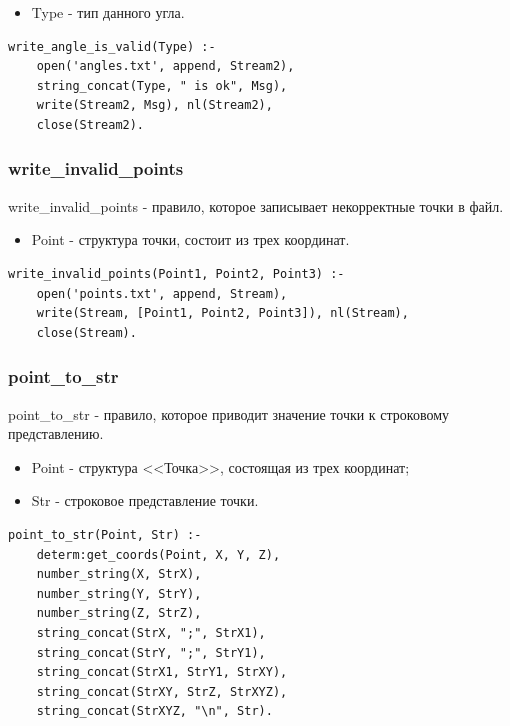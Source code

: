 \begin{itemize}
	\item Type - тип данного угла.
\end{itemize}

\begin{lstlisting}[caption=Реализация правила write\_angle\_is\_valid, label=rules:writeangleisvalid]
write_angle_is_valid(Type) :- 
	open('angles.txt', append, Stream2),
	string_concat(Type, " is ok", Msg),
	write(Stream2, Msg), nl(Stream2),
	close(Stream2).
\end{lstlisting}

\subsubsection{write\_invalid\_points}
\hspace{0.6cm} write\_invalid\_points - правило, которое записывает некорректные точки в файл.

\begin{itemize}
	\item Point - структура точки, состоит из трех координат.
\end{itemize}

\begin{lstlisting}[caption=Реализация правила write\_invalid\_points, label=rules:writeinvalidpoints]
write_invalid_points(Point1, Point2, Point3) :-
	open('points.txt', append, Stream),
	write(Stream, [Point1, Point2, Point3]), nl(Stream),
	close(Stream).
\end{lstlisting}

\subsubsection{point\_to\_str}
\hspace{0.6cm} point\_to\_str - правило, которое приводит значение точки к строковому представлению.

\begin{itemize}
	\item Point - структура <<Точка>>, состоящая из трех координат;
	\item Str - строковое представление точки.
\end{itemize}

\begin{lstlisting}[caption=Реализация правила point\_to\_str, label=rules:pointtostr]
point_to_str(Point, Str) :-
	determ:get_coords(Point, X, Y, Z),
	number_string(X, StrX),
	number_string(Y, StrY),
	number_string(Z, StrZ),
	string_concat(StrX, ";", StrX1),
	string_concat(StrY, ";", StrY1),
	string_concat(StrX1, StrY1, StrXY),
	string_concat(StrXY, StrZ, StrXYZ),
	string_concat(StrXYZ, "\n", Str).
\end{lstlisting}

